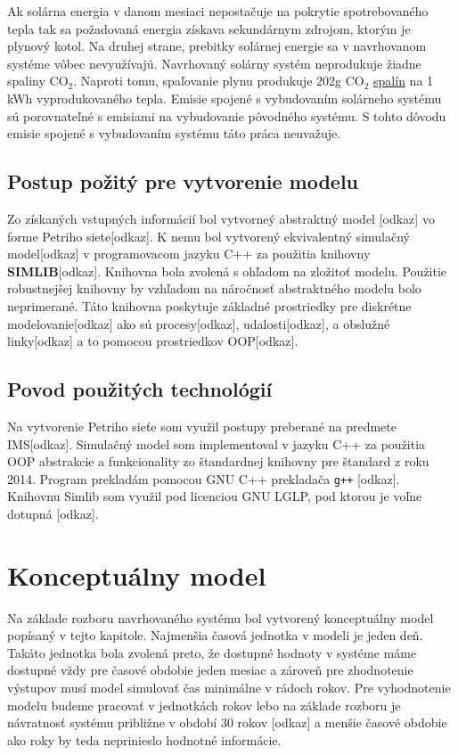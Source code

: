 \documentclass[a4paper, 11pt]{article}
\begin{document}
Ak solárna energia v danom mesiaci nepostačuje na pokrytie spotrebovaného tepla tak sa požadovaná energia získava sekundárnym zdrojom, ktorým je plynový kotol. Na druhej strane, prebitky solárnej energie sa v navrhovanom systéme vôbec nevyužívajú. Navrhovaný solárny systém neprodukuje žiadne spaliny CO$_2$. Naproti tomu, spaľovanie plynu produkuje 202g CO$_2$  \href{https://www.oplyne.info/ecology/porovnanie-produkcie-znecistujucich-latok-so2-tzl-nox-co-a-sklenikoveho-plynu-co2-vyprodukovanych-spalinami-v-rodinnom-dome-vykurovanie-drevom-ciernym-hnedym-uhlim-a-zemnym-plynom/}{spalín} na 1 kWh vyprodukovaného tepla. Emisie spojené s vybudovaním solárneho systému sú porovnateľné s emisiami na vybudovanie pôvodného systému. S tohto dôvodu emisie spojené s vybudovaním systému táto práca neuvažuje. 

\subsection{Postup požitý pre vytvorenie modelu}

Zo získaných vstupných informácií bol vytvorneý abstraktný model [odkaz] vo forme Petriho siete[odkaz]. K nemu bol vytvorený ekvivalentný simulačný model[odkaz] v programovacom jazyku C++ za použitia knihovny \textbf{SIMLIB}[odkaz]. Knihovna bola zvolená s ohľadom na zložitoť modelu. Použitie robustnejšej knihovny by vzhľadom na náročnosť abstraktného modelu bolo neprimerané. Táto knihovna poskytuje základné prostriedky pre diskrétne modelovanie[odkaz] ako sú procesy[odkaz], udalosti[odkaz], a obslužné linky[odkaz] a to pomocou prostriedkov OOP[odkaz].

\subsection{Povod použitých technológií}
Na vytvorenie Petriho sieťe som využil postupy preberané na predmete IMS[odkaz]. Simulačný model som implementoval v jazyku C++ za použitia OOP abstrakcie a funkcionality zo štandardnej knihovny pre štandard z roku 2014. Program prekladám pomocou GNU C++ prekladača \texttt{g++} [odkaz]. Knihovnu Simlib som využil pod licenciou GNU LGLP, pod ktorou je voľne dotupná [odkaz]. 

\section{Konceptuálny model}
Na základe rozboru navrhovaného systému bol vytvorený konceptuálny model popísaný v tejto kapitole.  Najmenšia časová jednotka v modeli je jeden deň. Takáto jednotka bola zvolená preto, že dostupné hodnoty v systéme máme dostupné vždy pre časové obdobie jeden mesiac a zároveň pre zhodnotenie výstupov musí model simulovať čas minimálne v rádoch rokov. Pre vyhodnotenie modelu budeme pracovať v jednotkách rokov lebo na základe rozboru je návratnosť systému približne v období 30 rokov [odkaz] a menšie časové obdobie ako roky by teda neprinieslo hodnotné informácie. 
\end{document}
